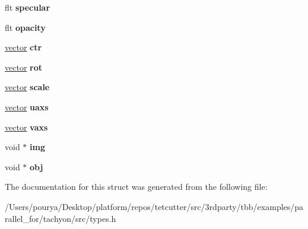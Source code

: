 \begin{DoxyCompactItemize}
\item 
\hypertarget{structtexture_abba7055b92bab04b516961b35181972e}{}flt {\bfseries specular}\label{structtexture_abba7055b92bab04b516961b35181972e}

\item 
\hypertarget{structtexture_ac8cbd52e20f60274890c4a425a1c322c}{}flt {\bfseries opacity}\label{structtexture_ac8cbd52e20f60274890c4a425a1c322c}

\item 
\hypertarget{structtexture_aa8c129b43e9f0bd4ed2c54c70dd46fc4}{}\hyperlink{structvector}{vector} {\bfseries ctr}\label{structtexture_aa8c129b43e9f0bd4ed2c54c70dd46fc4}

\item 
\hypertarget{structtexture_abdfe562a6e165a222983e95d09c58a4e}{}\hyperlink{structvector}{vector} {\bfseries rot}\label{structtexture_abdfe562a6e165a222983e95d09c58a4e}

\item 
\hypertarget{structtexture_ae822e00c2e102afd4bc184b6a7ed5dee}{}\hyperlink{structvector}{vector} {\bfseries scale}\label{structtexture_ae822e00c2e102afd4bc184b6a7ed5dee}

\item 
\hypertarget{structtexture_a35047e0eb9fb4abb060df3732a02b7a3}{}\hyperlink{structvector}{vector} {\bfseries uaxs}\label{structtexture_a35047e0eb9fb4abb060df3732a02b7a3}

\item 
\hypertarget{structtexture_a9af03d56a9af02fc991d7474b45b4812}{}\hyperlink{structvector}{vector} {\bfseries vaxs}\label{structtexture_a9af03d56a9af02fc991d7474b45b4812}

\item 
\hypertarget{structtexture_af557b01ffd2791e8021195e6de814755}{}void $\ast$ {\bfseries img}\label{structtexture_af557b01ffd2791e8021195e6de814755}

\item 
\hypertarget{structtexture_a87a21ec2e3628e0e21b55790288899d2}{}void $\ast$ {\bfseries obj}\label{structtexture_a87a21ec2e3628e0e21b55790288899d2}

\end{DoxyCompactItemize}


The documentation for this struct was generated from the following file\+:\begin{DoxyCompactItemize}
\item 
/\+Users/pourya/\+Desktop/platform/repos/tetcutter/src/3rdparty/tbb/examples/parallel\+\_\+for/tachyon/src/types.\+h\end{DoxyCompactItemize}
